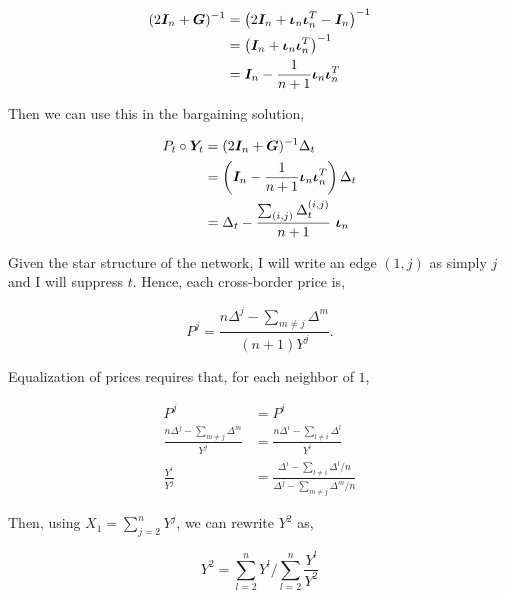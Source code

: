 \begin{equation*}
    \begin{split}
        (2\bm{I}_n + \bm{G})^{-1} &= \left( 2\bm{I}_n + \bm{\iota}_n \bm{\iota}_n^T - \bm{I}_n \right)^{-1}\\
        &= \left( \bm{I}_n + \bm{\iota}_n \bm{\iota}_n^T \right)^{-1} \\
        &= \bm{I}_n - \frac{1}{n + 1} \bm{\iota}_n \bm{\iota}_n^T
    \end{split}
\end{equation*}

Then we can use this in the bargaining solution,

\begin{equation*}
    \begin{split}
        P_t \circ \Y_t &= (2\I_n + \G)^{-1} \Delta_t \\
        &= \left( \I_n - \frac{1}{n + 1} \matr{\iota}_n \matr{\iota}_n^T \right) \Delta_t \\
        &= \Delta_t - \frac{\sum_{(i, j)} \Delta^{(i, j)}_t}{n+1} \ \matr{\iota}_n
    \end{split}
\end{equation*}

Given the star structure of the network, I will write an edge $(1, j)$ as simply $j$ and I will suppress $t$. Hence, each cross-border price is,

\begin{equation*}
    P^j = \frac{n\Delta^j - \sum_{m \neq j} \Delta^m }{(n + 1)Y^j}.
\end{equation*}

Equalization of prices requires that, for each neighbor of $1$,

\begin{equation*}
    \begin{split}
        P^j &= P^i \\
        \frac{n\Delta^j - \sum_{m \neq j} \Delta^m }{Y^j} &= \frac{n\Delta^i - \sum_{l \neq i} \Delta^l}{Y^i} \\
        \frac{Y^i}{Y^j} &= \frac{\Delta^i - \sum_{l \neq i} \Delta^l / n}{\Delta^j - \sum_{m \neq j} \Delta^m / n}
    \end{split}
\end{equation*}

Then, using $X_1 = \sum^n_{j = 2} Y^j$, we can rewrite $Y^2$ as,

\begin{equation*}
    Y^2 = \sum^n_{l = 2} Y^l \Big/ \sum^n_{l = 2} \frac{Y^l}{Y^2}
\end{equation*}

